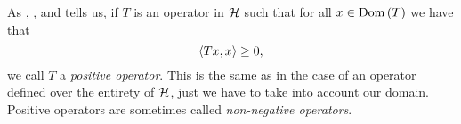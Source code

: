 \begin{remark}
  As {\cite[Definition 3.2]{konrad}}, {\cite[p.68]{teschl}}, and {\cite[Definition 9.19]{Hall2013}} tells us, if $T$ is an operator in $\mathcal{H}$ such that for all $x \in \operatorname{Dom}\left(T\right)$ we have that
    \begin{equation*}
      \left\langle Tx, x\right\rangle \geq 0,
    \end{equation*}
    we call $T$ a {\emph{positive operator}}. This is the same as in the case of an operator defined over the entirety of $\mathcal{H}$, just we have to take into account our domain. Positive operators are sometimes called {\emph{non-negative operators}}.
\end{remark}
%
%
%
%
%
